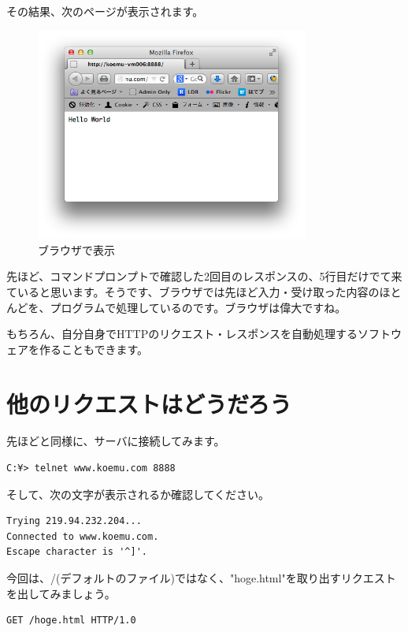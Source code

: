 \documentclass[a4j,11pt,openany]{jsbook}
\begin{document}
その結果、次のページが表示されます。

\begin{figure}[H]
    \begin{center}
        \includegraphics[height=7cm]{./browser.png}
        \caption{ブラウザで表示}
        \label{browser}
    \end{center}
\end{figure}

先ほど、コマンドプロンプトで確認した2回目のレスポンスの、5行目だけでて来ていると思います。そうです、ブラウザでは先ほど入力・受け取った内容のほとんどを、プログラムで処理しているのです。ブラウザは偉大ですね。

もちろん、自分自身でHTTPのリクエスト・レスポンスを自動処理するソフトウェアを作ることもできます。

\section{他のリクエストはどうだろう}

先ほどと同様に、サーバに接続してみます。

\begin{lstlisting}
C:¥> telnet www.koemu.com 8888
\end{lstlisting}    

そして、次の文字が表示されるか確認してください。

\begin{lstlisting}
Trying 219.94.232.204...
Connected to www.koemu.com.
Escape character is '^]'.
\end{lstlisting}

今回は、/(デフォルトのファイル)ではなく、"hoge.html"を取り出すリクエストを出してみましょう。

\begin{lstlisting}
GET /hoge.html HTTP/1.0
\end{lstlisting}
\end{document}
